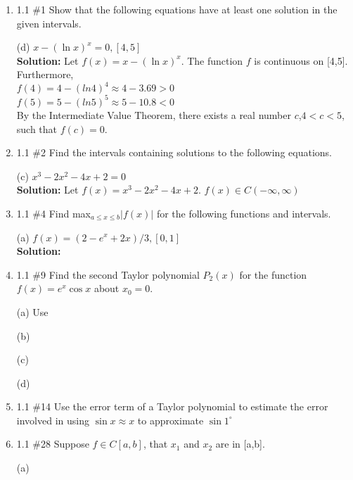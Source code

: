 \documentclass[12pt]{article}
\begin{document}
{}

\begin{enumerate}
    \item 1.1 \#1 Show that the following equations have at least one solution in the given intervals.

    (d) ${x-(\ln{x})^x=0, [4,5]}$ \\ \textbf{Solution:}
    Let ${f(x)=x-(\ln{x})^x}$. The function ${f}$ is continuous on [4,5]. Furthermore, \\
        ${f(4)=4-(ln{4})^4 \approx 4-3.69>0}$ \\
        ${f(5)=5-(ln{5})^5 \approx 5-10.8<0}$ \\

    By the Intermediate Value Theorem, there exists a real number \(c\),${4<c<5}$, such that ${f(c)=0}$.

    \item 1.1 \#2 Find the intervals containing solutions to the following equations.

    (c) ${x^3-2x^2-4x+2=0}$ \\ \textbf{Solution:}
    Let ${f(x)=x^3-2x^2-4x+2}$. ${f(x) \in C(-\infty,\infty)}$

    \item 1.1 \#4 Find max${_{a \leq x \leq b}|f(x)|}$ for the following functions and intervals.

    (a) ${f(x)=(2-e^x+2x)/3, [0,1]}$ \\ \textbf{Solution:}

    \item 1.1 \#9 Find the second Taylor polynomial ${P_2(x)}$ for the function ${f(x)=e^x\cos{x}}$ about ${x_0=0.}$

    (a) Use

    (b)

    (c)

    (d)

    \item 1.1 \#14 Use the error term of a Taylor polynomial to estimate the error involved in using ${\sin{x} \approx x}$ to approximate ${\sin{1^\circ}}$

    \item 1.1 \#28 Suppose ${f \in C[a,b]}$, that ${x_1}$ and ${x_2}$ are in [a,b].

    (a)


\end{enumerate}
\end{document}
